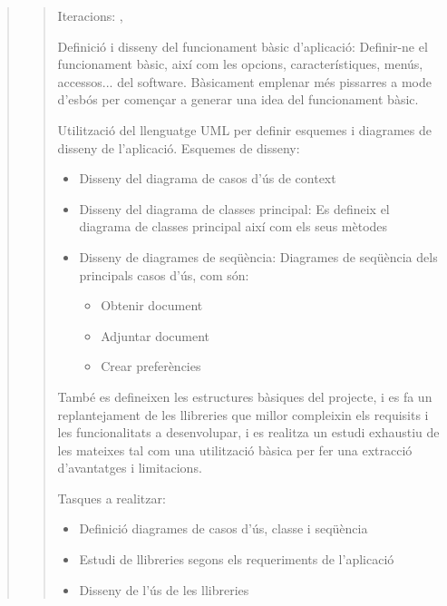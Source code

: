 \documentclass[letterpaper,11pt,catalan]{sphinxmanual}
\begin{document}
\begin{quote}
\begin{enumerate}
\end{enumerate}
\begin{quote}

Iteracions: , 

Definició i disseny del funcionament bàsic d'aplicació: Definir-ne el funcionament bàsic, així
com les opcions, característiques, menús, accessos... del software. Bàsicament emplenar més
pissarres a mode d'esbós per començar a generar una idea del funcionament bàsic.

Utilització del llenguatge UML per definir esquemes i diagrames de disseny de l'aplicació.
Esquemes de disseny:
\begin{itemize}
\item {} 
Disseny del diagrama de casos d'ús de context

\item {} 
Disseny del diagrama de classes principal: Es defineix el diagrama de classes principal així
com els seus mètodes

\item {} 
Disseny de diagrames de seqüència: Diagrames de seqüència dels principals casos d'ús, com són:
\begin{itemize}
\item {} 
Obtenir document

\item {} 
Adjuntar document

\item {} 
Crear preferències

\end{itemize}

\end{itemize}

També es defineixen les estructures bàsiques del projecte, i es fa un replantejament de les
llibreries que millor compleixin els requisits i les funcionalitats a desenvolupar, i es realitza
un estudi exhaustiu de les mateixes tal com una utilització bàsica per fer una extracció d'avantatges
i limitacions.

Tasques a realitzar:
\begin{itemize}
\item {} 
Definició diagrames de casos d'ús, classe i seqüència

\item {} 
Estudi de llibreries segons els requeriments de l'aplicació

\item {} 
Disseny de l'ús de les llibreries


\end{itemize}
\end{quote}
\end{quote}
\end{document}
